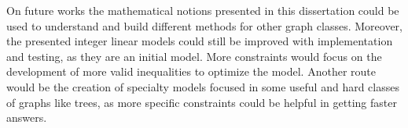 \documentclass[msc,english,table,xcdraw]{ppgccufmg}
\begin{document}
On future works the mathematical notions presented in this dissertation could 
be used to understand and build different methods for other graph classes.
Moreover, the presented integer linear models could still be improved with 
implementation and testing, as they are an initial model.
More constraints would focus on the development of more valid inequalities to
optimize the model.
Another route would be the creation of specialty models focused in some useful 
and hard classes of graphs like trees, as more specific constraints could be 
helpful in getting faster answers.

\renewcommand\bibname{References} %




\begin{appendices}
\end{appendices}
\end{document}
